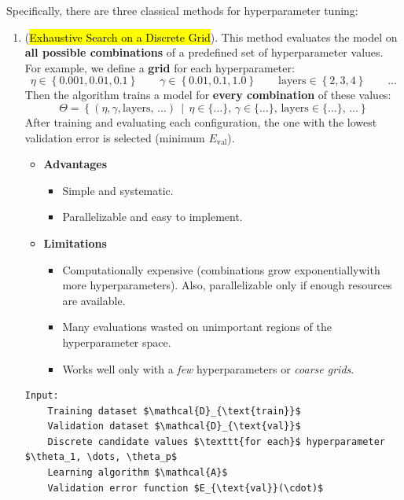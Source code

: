 \highspace
Specifically, there are three classical methods for hyperparameter tuning:
\begin{enumerate}
    \item {} (\hl{Exhaustive Search on a Discrete Grid}). This method evaluates the model on \textbf{all possible combinations} of a predefined set of hyperparameter values. For example, we define a \textbf{grid} for each hyperparameter:
    \begin{equation*}
        \eta \in \left\{0.001, 0.01, 0.1\right\} \qquad
        \gamma \in \left\{0.01, 0.1, 1.0\right\} \qquad
        \text{layers} \in \left\{2, 3, 4\right\} \qquad
        \dots
    \end{equation*}
    Then the algorithm trains a model for \textbf{every combination} of these values:
    \begin{equation*}
        \Theta = \left\{\left(\eta, \gamma, \text{layers, \ldots}\right) \, \mid \, \eta \in \{\ldots\}, \,\gamma \in \{\ldots\}, \,\text{layers} \in \{\ldots\}, \, \ldots\right\}
    \end{equation*}
    After training and evaluating each configuration, the one with the lowest validation error is selected (minimum $E_{\text{val}}$).
    \begin{itemize}
        \item[\textcolor{Green3}{\faIcon{check}}] \textcolor{Green3}{\textbf{Advantages}}
        \begin{itemize}
            \item[\textcolor{Green3}{\faIcon{check}}] Simple and systematic.
            \item[\textcolor{Green3}{\faIcon{check}}] Parallelizable and easy to implement.
        \end{itemize}
        \item[\textcolor{Red3}{\faIcon{exclamation-triangle}}] \textcolor{Red2}{\textbf{Limitations}}
        \begin{itemize}
            \item[\textcolor{Red2}{\faIcon{times}}] Computationally expensive (combinations grow exponentially\break with more hyperparameters). Also, parallelizable only if enough resources are available.
            \item[\textcolor{Red2}{\faIcon{times}}] Many evaluations wasted on unimportant regions of the hyperparameter space.
            \item[\textcolor{Red2}{\faIcon{times}}] Works well only with a \emph{few} hyperparameters or \emph{coarse grids}.
        \end{itemize}
    \end{itemize}
    \begin{lstlisting}[language=pseudo-code,mathescape=true,style={pseudocode-style},caption={Grid Search Algorithm}]
Input:
    Training dataset $\mathcal{D}_{\text{train}}$
    Validation dataset $\mathcal{D}_{\text{val}}$
    Discrete candidate values $\texttt{for each}$ hyperparameter $\theta_1, \dots, \theta_p$
    Learning algorithm $\mathcal{A}$
    Validation error function $E_{\text{val}}(\cdot)$


\end{lstlisting}
\end{enumerate}

